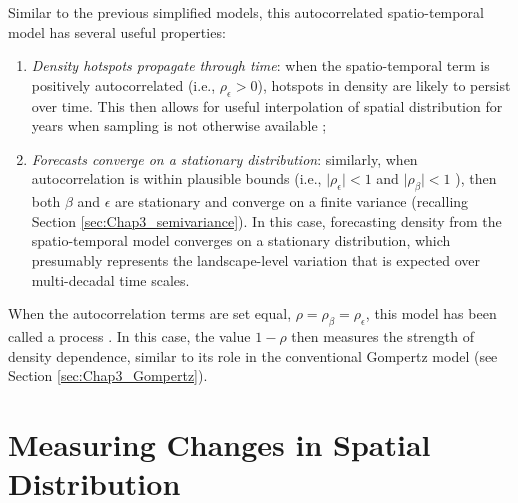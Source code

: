 Similar to the previous simplified models, this autocorrelated spatio-temporal model has several useful properties:
\begin{enumerate}
    \item \textit{Density hotspots propagate through time}: when the spatio-temporal term is positively autocorrelated (i.e., \(\rho_{\epsilon} > 0\)), hotspots in density are likely to persist over time.  This then allows for useful interpolation of spatial distribution for years when sampling is not otherwise available \cite{oleary_adapting_2020};
    
    \item \textit{Forecasts converge on a stationary distribution}: similarly, when autocorrelation is within plausible bounds (i.e., \( \lvert \rho_{\epsilon} \rvert < 1 \) and \( \lvert \rho_{\beta} \rvert < 1 \) ), then both \( \beta \) and \( \epsilon \) are stationary and converge on a finite variance (recalling Section \ref{sec:Chap3_semivariance}). In this case, forecasting density from the spatio-temporal model converges on a stationary distribution, which presumably represents the landscape-level variation that is expected over multi-decadal time scales. 
\end{enumerate}
When the autocorrelation terms are set equal, \( \rho = \rho_{\beta} = \rho_{\epsilon} \), this model has been called a  process \cite{thorson_importance_2014}.  In this case, the value \( 1-\rho \) then measures the strength of density dependence, similar to its role in the conventional Gompertz model (see Section \ref{sec:Chap3_Gompertz}).  

\section{Measuring Changes in Spatial Distribution} \label{sec:Chap8_changes_in_spatial_distribution}

